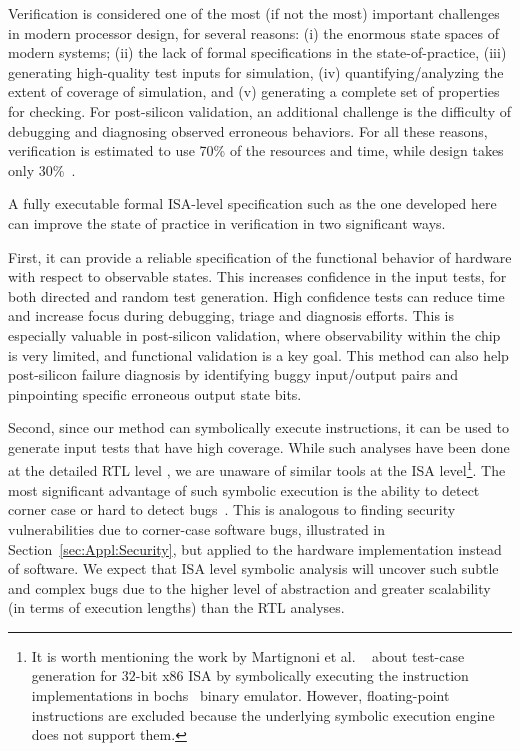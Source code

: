 Verification is considered one of the most (if not the most) important 
challenges in modern processor design, for several reasons: 
(i) the enormous state spaces of modern systems; 
(ii) the lack of formal specifications in the state-of-practice, 
(iii) generating high-quality test inputs for simulation, 
(iv) quantifying/analyzing the extent of coverage of simulation, and 
(v) generating a complete set of properties for checking. 
For post-silicon validation, an additional challenge is the difficulty 
of debugging and diagnosing observed erroneous behaviors. 
For all these reasons, verification is estimated to use 70\% of the 
resources and time, while design takes only 30\%~\cite{Foster:DAC2015}.

A fully executable formal ISA-level specification such as the one developed here can improve the state of practice in verification in two significant ways. 

First, it can provide a reliable specification of the functional behavior of 
hardware with respect to observable states. This increases 
confidence in the input tests, for both directed and random test generation. 
High confidence tests can reduce time and increase focus during debugging, 
triage and diagnosis efforts. This is especially valuable in post-silicon 
validation, where observability within the chip is very limited, and functional 
validation is a key goal. This method can also help post-silicon failure 
diagnosis by identifying buggy input/output pairs and pinpointing specific 
erroneous output state bits.

Second, since our method can symbolically execute instructions, it can be used 
to generate input tests that have high coverage. While such analyses have been 
done at the detailed RTL level \cite{liu2014, liu2011, mishra18}, we are 
unaware of similar tools at the \ISA ISA level\footnote{It is worth mentioning the work by Martignoni et al. ~\cite{Martignoni:ASPLOS2012} about test-case generation for $32$-bit x86 ISA by symbolically executing the instruction implementations in bochs~\cite{Bochs1996} binary emulator. However, floating-point instructions are excluded because the underlying symbolic execution engine does not support them.}. The most significant advantage of 
such symbolic execution is the ability to detect corner case or hard to detect 
bugs~\cite{liu2014,Fonseca:Eurosys2017}. This is analogous to finding security vulnerabilities 
due to corner-case software bugs, illustrated in 
Section~\ref{sec:Appl:Security}, but applied to the hardware implementation instead of software. We expect that ISA level symbolic analysis will 
uncover such subtle and complex bugs due to the higher level of abstraction 
and greater scalability (in terms of execution lengths) than the RTL analyses.

